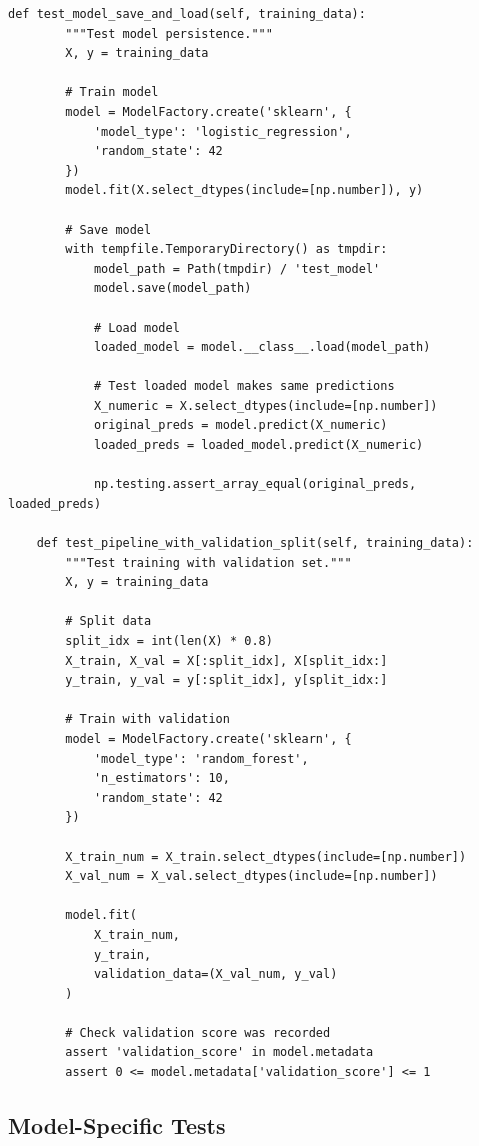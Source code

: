 \begin{lstlisting}[style=python, caption=Integration tests for training pipeline]
    def test_model_save_and_load(self, training_data):
        """Test model persistence."""
        X, y = training_data

        # Train model
        model = ModelFactory.create('sklearn', {
            'model_type': 'logistic_regression',
            'random_state': 42
        })
        model.fit(X.select_dtypes(include=[np.number]), y)

        # Save model
        with tempfile.TemporaryDirectory() as tmpdir:
            model_path = Path(tmpdir) / 'test_model'
            model.save(model_path)

            # Load model
            loaded_model = model.__class__.load(model_path)

            # Test loaded model makes same predictions
            X_numeric = X.select_dtypes(include=[np.number])
            original_preds = model.predict(X_numeric)
            loaded_preds = loaded_model.predict(X_numeric)

            np.testing.assert_array_equal(original_preds, loaded_preds)

    def test_pipeline_with_validation_split(self, training_data):
        """Test training with validation set."""
        X, y = training_data

        # Split data
        split_idx = int(len(X) * 0.8)
        X_train, X_val = X[:split_idx], X[split_idx:]
        y_train, y_val = y[:split_idx], y[split_idx:]

        # Train with validation
        model = ModelFactory.create('sklearn', {
            'model_type': 'random_forest',
            'n_estimators': 10,
            'random_state': 42
        })

        X_train_num = X_train.select_dtypes(include=[np.number])
        X_val_num = X_val.select_dtypes(include=[np.number])

        model.fit(
            X_train_num,
            y_train,
            validation_data=(X_val_num, y_val)
        )

        # Check validation score was recorded
        assert 'validation_score' in model.metadata
        assert 0 <= model.metadata['validation_score'] <= 1
\end{lstlisting}

\subsection{Model-Specific Tests}

